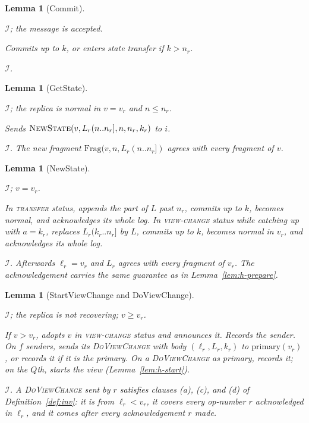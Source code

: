 \documentclass[11pt,a4paper]{article}
\theoremstyle{plain}
\newtheorem{lemma}[theorem]{Lemma}
\theoremstyle{definition}
\theoremstyle{remark}
\newcommand{\msg}[1]{\textsc{#1}}
\newcommand{\dvc}{\msg{DoViewChange}}
\newcommand{\Inv}{\mathcal{I}}
\newcommand{\Frag}{\mathrm{Frag}}
\newcommand{\primary}{\mathrm{primary}}
\newcommand{\viewchange}{\textsc{view-change}}
\newcommand{\transfer}{\textsc{transfer}}
\begin{document}
\begin{lemma}[Commit]
\label{lem:h-commit}
\begin{iface}
  \item[Precondition] $\Inv$; the message is accepted.
  \item[Effect] Commits up to $k$, or enters state transfer if
    $k > n_r$.
  \item[Guarantee] $\Inv$.
\end{iface}
\end{lemma}

\begin{lemma}[GetState]
\label{lem:h-getstate}
\begin{iface}
  \item[Precondition] $\Inv$; the replica is normal in $v = v_r$ and
    $n \le n_r$.
  \item[Effect] Sends $\msg{NewState}(v, L_r(n{..}n_r], n, n_r, k_r)$ to $i$.
  \item[Guarantee] $\Inv$. The new fragment $\Frag(v, n, L_r(n{..}n_r])$
    agrees with every fragment of $v$.
\end{iface}
\end{lemma}

\begin{lemma}[NewState]
\label{lem:h-newstate}
\begin{iface}
  \item[Precondition] $\Inv$; $v = v_r$.
  \item[Effect] In \transfer{} status, appends the part of $L$ past
    $n_r$, commits up to $k$, becomes normal, and acknowledges its whole
    log. In \viewchange{} status while catching up with $a = k_r$,
    replaces $L_r(k_r{..}n_r]$ by $L$, commits up to $k$, becomes normal
    in $v_r$, and acknowledges its whole log.
  \item[Guarantee] $\Inv$. Afterwards $\ell_r = v_r$ and $L_r$ agrees
    with every fragment of $v_r$. The acknowledgement carries the same
    guarantee as in Lemma~\ref{lem:h-prepare}.
\end{iface}
\end{lemma}

\begin{lemma}[StartViewChange and DoViewChange]
\label{lem:h-svc}
\begin{iface}
  \item[Precondition] $\Inv$; the replica is not recovering; $v \ge v_r$.
  \item[Effect] If $v > v_r$, adopts $v$ in \viewchange{} status and
    announces it. Records the sender. On $f$ senders, sends its \dvc{}
    with body $(\ell_r, L_r, k_r)$ to $\primary(v_r)$, or records it if
    it is the primary. On a \dvc{} as primary, records it; on the $Q$th,
    starts the view (Lemma~\ref{lem:h-start}).
  \item[Guarantee] $\Inv$. A \dvc{} sent by $r$ satisfies clauses (a), (c),
    and (d) of Definition~\ref{def:inv}: it is from $\ell_r < v_r$, it
    covers every op-number $r$ acknowledged in $\ell_r$, and it comes
    after every acknowledgement $r$ made.
\end{iface}
\end{lemma}
\end{document}
